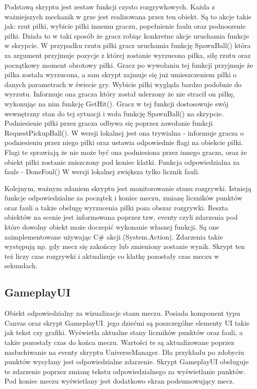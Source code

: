 \documentclass[a4paper,12pt,twoside,openany]{report}
\begin{document}
Podstawą skryptu jest zestaw funkcji czysto rozgrywkowych. Każda z ważniejszych mechanik w grze jest realizowana przez ten obiekt. Są to akcje takie jak: rzut piłki, wybicie piłki innemu graczu, popełnienie faulu oraz podnoszenie piłki. Działa to w taki sposób że gracz robiąc konkretne akcje uruchamia funkcje w skrypcie. W przypadku rzutu piłki gracz uruchamia funkcję SpawnBall() która za argument przyjmuje pozycje z której zostanie wyrzucona piłka, siłę rzutu oraz początkowy moment obrotowy piłki. Gracz po wywołaniu tej funkcji przyjmuje że piłka została wyrzucona, a sam skrypt zajmuje się już umieszczeniem piłki o danych parametrach w świecie gry. Wybicie piłki wygląda bardzo podobnie do wyrzutu. Informuje ona gracza który został uderzony że nie stracił on piłkę, wykonując na nim funkcję GetHit(). Gracz w tej funkcji dostosowuje swój wewnętrzny stan do tej sytuacji i woła funkcję SpawnBall() na skrypcie. Podniesienie piłki przez gracza odbywa się poprzez zawołanie funkcji RequestPickupBall(). W wersji lokalnej jest ona trywialna - informuje gracza o podniesieniu przez niego piłki oraz ustawia odpowiednie flagi na obiekcie piłki. Flagi te sprawiają że nie może być ona podniesiona przez innego gracza, oraz że obiekt piłki zostanie zniszczony pod koniec klatki. Funkcja odpowiedzialna za faule - DoneFoul() W wersji lokalnej zwiększa tylko licznik fauli.

Kolejnym, ważnym zdaniem skryptu jest monitorowanie stanu rozgrywki. Istnieją funkcje odpowiedzialne za początek i koniec meczu, zmianę liczników punktów oraz fauli a także obsługę wyrzucenia piłki poza obszar rozgrywki. Reszta obiektów na scenie jest informowana poprzez tzw. eventy czyli zdarzenia pod które dowolny obiekt może doczepić wykonanie własnej funkcji. Są one zaimplementowane używając C\# akcji (System.Action). Zdarzenia takie występują np. gdy mecz się zakończy lub zmieniony zostanie wynik. Skrypt ten też liczy czas rozgrywki i aktualizuje co klatkę pozostały czas meczu w sekundach.

\subsection{GameplayUI}
\label{gameplayui}
Obiekt odpowiedzialny za wizualizacje stanu meczu. Posiada komponent typu Canvas oraz skrypt GameplayUI. jego dziećmi są poszczególne elementy UI takie jak tekst czy grafiki. Wyświetla aktualne stany liczników punktów oraz fauli, a także pozostały czas do końca meczu. Wartości te są aktualizowane poprzez nasłuchiwanie na eventy skryptu UniverseManager. Dla przykładu po zdobyciu punktów wysyłany jest odpowiedzialne zdarzenie. Skrypt GameplayUI obsługuje te zdarzenie poprzez zmianę tekstu odpowiedzialnego za wyświetlanie punktów. Pod koniec meczu wyświetlany jest dodatkowo ekran podsumowujący mecz.
\end{document}
